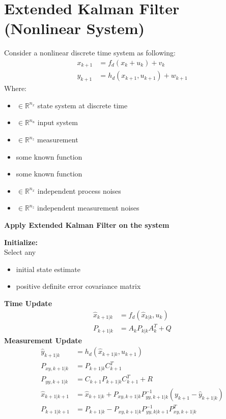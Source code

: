 \documentclass[12pt,a4paper]{article}
\begin{document}
	\section{Extended Kalman Filter (Nonlinear System)}
	Consider a nonlinear discrete time system as following:
	\begin{equation}
		\begin{split}
			x_{k+1} &= f_d(x_k+u_k) + v_k \\
			y_{k+1} &= h_d(x_{k+1},u_{k+1}) + w_{k+1}
		\end{split}
		\label{eq5}
	\end{equation}
	Where:
	\begin{itemize}
		\item { \(\in \mathbb{R}^{n_x}\) state system at discrete time}
		\item { \(\in \mathbb{R}^{n_u}\) input system}
		\item { \(\in \mathbb{R}^{n_z}\) measurement}
		\item { some known function}
		\item { some known function}
		\item { \(\in \mathbb{R}^{n_x}\) independent process noises}
		\item { \(\in \mathbb{R}^{n_z}\) independent measurement noises}
	\end{itemize}
	\begin{center}
		\textbf{Apply Extended Kalman Filter on the system}
	\end{center}
	\textbf{Initialize:}\\
	Select any
	\begin{itemize}
		\item { initial state estimate}
		\item { positive definite error covariance matrix}
	\end{itemize}
	\textbf{Time Update}
	\begin{equation}
		\begin{split}
			\hat{x}_{k+1|k} &= f_d(\hat{x}_{k|k},u_k) \\
			P_{k+1|k} &= A_kP_{k|k}A^T_k+Q
		\end{split}
		\label{eq6}
	\end{equation}
	\textbf{Measurement Update}
	\begin{equation}
		\begin{split}
			\hat{y}_{k+1|k} &= h_d(\hat{x}_{k+1|k},u_{k+1})\\
			P_{xy,k+1|k}    &= P_{k+1|k}C^T_{k+1}\\
			P_{yy,k+1|k}    &= C_{k+1}P_{k+1|k}C^T_{k+1}+R\\
			\hat{x}_{k+1|k+1} &= \hat{x}_{k+1|k} + P_{xy,k+1|k}P^{-1}_{yy,k+1|k}(y_{k+1}-\hat{y}_{k+1|k})\\
			P_{k+1|k+1}     &= P_{k+1|k} - P_{xy,k+1|k}P^{-1}_{yy,k|k+1}P^T_{xy,k+1|k} 
		\end{split}
		\label{eq7}
	\end{equation}
\end{document}
